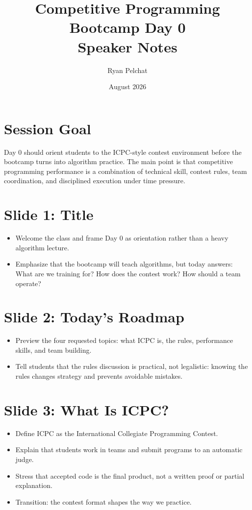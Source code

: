 \documentclass[11pt]{article}
\title{Competitive Programming Bootcamp Day 0\\Speaker Notes}
\author{Ryan Pelchat}
\date{August 2026}
\begin{document}
\maketitle

\section*{Session Goal}
Day 0 should orient students to the ICPC-style contest environment before the bootcamp turns into algorithm practice. The main point is that competitive programming performance is a combination of technical skill, contest rules, team coordination, and disciplined execution under time pressure.

\section*{Slide 1: Title}
\begin{itemize}
  \item Welcome the class and frame Day 0 as orientation rather than a heavy algorithm lecture.
  \item Emphasize that the bootcamp will teach algorithms, but today answers: What are we training for? How does the contest work? How should a team operate?
\end{itemize}

\section*{Slide 2: Today's Roadmap}
\begin{itemize}
  \item Preview the four requested topics: what ICPC is, the rules, performance skills, and team building.
  \item Tell students that the rules discussion is practical, not legalistic: knowing the rules changes strategy and prevents avoidable mistakes.
\end{itemize}

\section*{Slide 3: What Is ICPC?}
\begin{itemize}
  \item Define ICPC as the International Collegiate Programming Contest.
  \item Explain that students work in teams and submit programs to an automatic judge.
  \item Stress that accepted code is the final product, not a written proof or partial explanation.
  \item Transition: the contest format shapes the way we practice.
\end{itemize}
\end{document}

